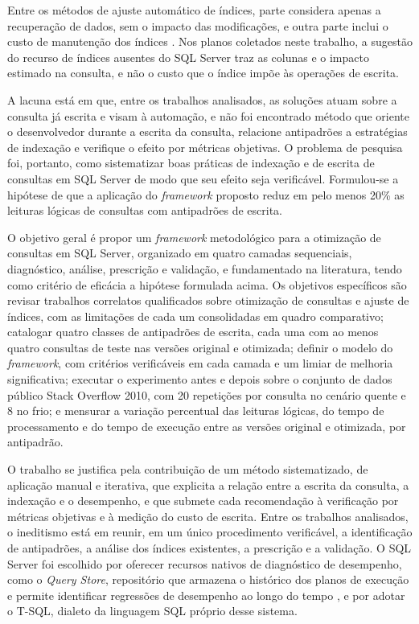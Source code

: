 Entre os métodos de ajuste automático de índices, parte considera apenas a recuperação de dados, sem o impacto das modificações, e outra parte inclui o custo de manutenção dos índices \cite{wu2024indextuning}. Nos planos coletados neste trabalho, a sugestão do recurso de índices ausentes do SQL Server traz as colunas e o impacto estimado na consulta, e não o custo que o índice impõe às operações de escrita.

A lacuna está em que, entre os trabalhos analisados, as soluções atuam sobre a consulta já escrita e visam à automação, e não foi encontrado método que oriente o desenvolvedor durante a escrita da consulta, relacione antipadrões a estratégias de indexação e verifique o efeito por métricas objetivas. O problema de pesquisa foi, portanto, como sistematizar boas práticas de indexação e de escrita de consultas em SQL Server de modo que seu efeito seja verificável. Formulou-se a hipótese de que a aplicação do \textit{framework} proposto reduz em pelo menos 20\% as leituras lógicas de consultas com antipadrões de escrita.  

O objetivo geral é propor um \textit{framework} metodológico para a otimização de consultas em SQL Server, organizado em quatro camadas sequenciais, diagnóstico, análise, prescrição e validação, e fundamentado na literatura, tendo como critério de eficácia a hipótese formulada acima. Os objetivos específicos são revisar trabalhos correlatos qualificados sobre otimização de consultas e ajuste de índices, com as limitações de cada um consolidadas em quadro comparativo; catalogar quatro classes de antipadrões de escrita, cada uma com ao menos quatro consultas de teste nas versões original e otimizada; definir o modelo do \textit{framework}, com critérios verificáveis em cada camada e um limiar de melhoria significativa; executar o experimento antes e depois sobre o conjunto de dados público Stack Overflow 2010, com 20 repetições por consulta no cenário quente e 8 no frio; e mensurar a variação percentual das leituras lógicas, do tempo de processamento e do tempo de execução entre as versões original e otimizada, por antipadrão.

O trabalho se justifica pela contribuição de um método sistematizado, de aplicação manual e iterativa, que explicita a relação entre a escrita da consulta, a indexação e o desempenho, e que submete cada recomendação à verificação por métricas objetivas e à medição do custo de escrita. Entre os trabalhos analisados, o ineditismo está em reunir, em um único procedimento verificável, a identificação de antipadrões, a análise dos índices existentes, a prescrição e a validação. O SQL Server foi escolhido por oferecer recursos nativos de diagnóstico de desempenho, como o \textit{Query Store}, repositório que armazena o histórico dos planos de execução e permite identificar regressões de desempenho ao longo do tempo \cite{fritchey2018qpt}, e por adotar o T-SQL, dialeto da linguagem SQL próprio desse sistema.

